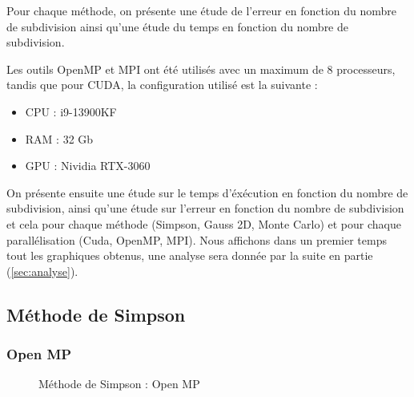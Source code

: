 \documentclass[10pt,a4paper]{article}
\begin{document}
Pour chaque méthode, on présente une étude de l'erreur en fonction du nombre de subdivision ainsi qu'une étude du temps en fonction du nombre de subdivision.

Les outils OpenMP et MPI ont été utilisés avec un maximum de 8 processeurs, tandis que pour CUDA, la configuration utilisé est la suivante : 
\begin{itemize}
    \item CPU : i9-13900KF
    \item RAM : 32 Gb
    \item GPU : Nividia RTX-3060
\end{itemize}

On présente ensuite une étude sur le temps d'éxécution en fonction du nombre de subdivision, ainsi qu'une étude sur l'erreur en fonction du nombre de subdivision et cela pour chaque méthode (Simpson, Gauss 2D, Monte Carlo) et pour chaque parallélisation (Cuda, OpenMP, MPI).
Nous affichons dans un premier temps tout les graphiques obtenus, une analyse sera donnée par la suite en partie (\ref{sec:analyse}).


\subsection{Méthode de Simpson}

\subsubsection{Open MP}


  \begin{figure}[H]
    \centering

    \hfill 
  
    \caption{Méthode de Simpson : Open MP}
    \label{fig:simpMP}
  \end{figure}
\end{document}
